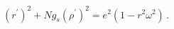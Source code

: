 \begin{equation}
\label{cons}
(r^\prime)^2 + N g_s (\rho^\prime)^2 = e^2 \left( 1 - r^2 \omega^2 \right)\,.
\end{equation}

